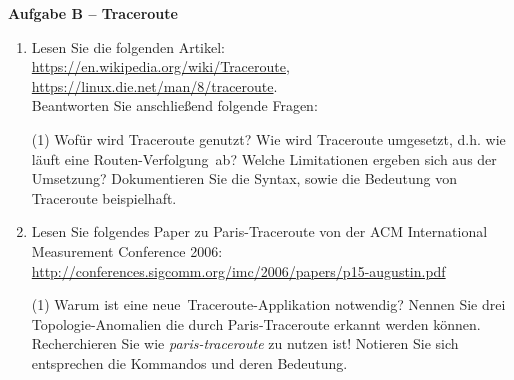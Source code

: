 \documentclass[paper=a4,fontsize=11pt]{scrartcl}%
\numberwithin{equation}{section}
\begin{document}
\begin{center}\Large{\textbf{Aufgabe B -- Traceroute}}\end{center}\vskip0.2in
\begin{enumerate}
	\item Lesen Sie die folgenden Artikel:\\
	\url{https://en.wikipedia.org/wiki/Traceroute},\\
	\url{https://linux.die.net/man/8/traceroute}.\\
	Beantworten Sie anschließend folgende Fragen:
	\begin{tasks}(1)
		\task Wofür wird Traceroute genutzt?
		\task Wie wird Traceroute umgesetzt, d.h. wie läuft eine \glqq Routen-Verfolgung\grqq\ ab?
		\task Welche Limitationen ergeben sich aus der Umsetzung?
		\task Dokumentieren Sie die Syntax, sowie die Bedeutung von Traceroute beispielhaft.
	\end{tasks}
	\item Lesen Sie folgendes Paper zu Paris-Traceroute von der ACM International Measurement Conference 2006:\\
	\url{http://conferences.sigcomm.org/imc/2006/papers/p15-augustin.pdf}
	\begin{tasks}(1)
		\task Warum ist eine \glqq neue\grqq\ Traceroute-Applikation notwendig?
		\task Nennen Sie drei Topologie-Anomalien die durch Paris-Traceroute erkannt werden können.
		\task Recherchieren Sie wie \emph{paris-traceroute} zu nutzen ist! Notieren Sie sich entsprechen die Kommandos und deren Bedeutung.
	\end{tasks}
\end{enumerate}
\end{document}
